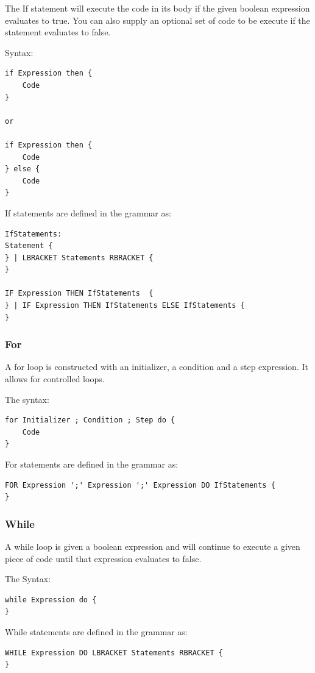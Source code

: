 \documentclass[]{final_report}
\begin{document}
The If statement will execute the code in its body if the given boolean expression evaluates to true. You can also supply an optional set of code to be execute if the statement evaluates to false.

Syntax: 
\begin{verbatim}
if Expression then {
	Code
}

or

if Expression then {
	Code
} else {
	Code
}
\end{verbatim}

If statements are defined in the grammar as:
\begin{verbatim}
IfStatements: 
Statement {
} | LBRACKET Statements RBRACKET {
}

IF Expression THEN IfStatements  {
} | IF Expression THEN IfStatements ELSE IfStatements {
}
\end{verbatim}

\subsubsection{For}

A for loop is constructed with an initializer, a condition and a step expression. It allows for controlled loops.

The syntax: \begin{verbatim}
for Initializer ; Condition ; Step do {
	Code
}
\end{verbatim}

For statements are defined in the grammar as: \begin{verbatim}
FOR Expression ';' Expression ';' Expression DO IfStatements {
}
\end{verbatim}

\subsubsection{While}

A while loop is given a boolean expression and will continue to execute a given piece of code until that expression evaluates to false.

The Syntax: \begin{verbatim}
while Expression do {
}
\end{verbatim}

While statements are defined in the grammar as: \begin{verbatim}
WHILE Expression DO LBRACKET Statements RBRACKET {
} 
\end{verbatim}
\end{document}
